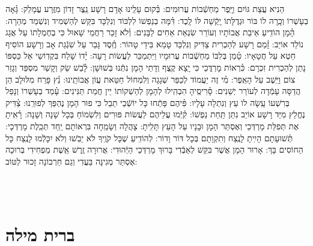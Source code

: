 \documentclass[twoside, openany, parskip=half, 11pt]{book}
\begin{document}
הֵנִיא עֲצַת גּוֹיִם וַיָּֽפֶר מַחְשְֿׁבוֹת עֲרוּמִים: \hfill \break
בְּ֗קוּם עָלֵֽינוּ אָדָם רָשָׁע נֵֽצֶר זָדוֹן מִזֶּֽרַע עֲמָלֵק: \hfill \break
גָּ֗אָה בְעָשְׁרוֹ וְכָֽרָה לוֹ בּוֹר 	וּגְדֻלָּתוֹ יָֽקְֿשָׁה לּוֹ לָֽכֶד: \hfill \break
דִּ֗מָּה בְנַפְשׁוֹ לִלְכּוֹד וְנִלְכָּד 	בִּקֵּשׁ לְהַשְׁמִיד וְנִשְׁמַד מְהֵרָה: \hfill \break
הָ֗מָן הוֹדִֽיעַ אֵיבַת אֲבוֹתָיו 	וְעוֹרֵר שִׂנְאַת אַחִים לַבָּנִים: \hfill \break
וְ֗לֹא זָכַר רַחֲמֵי שָׁאוּל 	כִּי בְחֶמְלָתוֹ עַל אֲגָג נוֹלַד אוֹיֵב: \hfill \break
זָ֗מַם רָשָׁע לְהַכְרִית צַדִּיק 	וְנִלְכַּד טָמֵא בִּידֵי טָהוֹר: \hfill \break
חֶֽ֗סֶד גָּבַר עַל שִׁגְֿגַת אָב 	וְרָשָׁע הוֹסִיף חֵטְא עַל חֲטָאָיו: \hfill \break
טָ֗מַן בְּלִבּוֹ מַחְשְֿׁבוֹת עֲרוּמָיו 	וַיִּתְמַכֵּר לַעֲשׂוֹת רָעָה: \hfill \break
יָ֗דוֹ שָׁלַח בִּקְדֽוֹשֵי אֵל 	כַּסְפּוֹ נָתַן לְהַכְרִית זִכְרָם: \hfill \break
כִּ֗רְאוֹת מׇרְדֳּכַי כִּי יָֽצָא קֶֽצֶף 	וְדָתֵי הָמָן נִתְּֿנוּ בְּשׁוּשָׁן: \hfill \break
לָ֗בַשׁ שַׂק וְקָשַׁר מִסְפֵּד 	וְגָזַר צוֹם וַיֵּֽשֶׁב עַל הָאֵֽפֶר: \hfill \break
מִ֗י זֶה יַעֲמוֹד לְכַפֵּר שְׁגָגָה 	וְלִמְחוֹל חַטַּאת עֲוֹן אֲבוֹתֵֽינוּ: \hfill \break
נֵ֗ץ פָּרַח מִלּוּלָב 	הֵן הֲדַסָּה עָמְֿדָה לְעוֹרֵר יְשֵׁנִים: \hfill \break
סָ֗רִיסֶֽיהָ הִבְהִֽילוּ לְהָמָן 	לְהַשְׁקוֹתוֹ יֵין חֲמַת תַּנִּינִים: \hfill \break
עָ֗מַד בְעָשְׁרוֹ וְנָפַל בְּרִשְׁעוֹ 	עָֽשָׂה לוֹ עֵץ וְנִתְלָה עָלָיו: \hfill \break
פִּ֗יהֶם פָּתְֿחוּ כָּל יוֹשְֿׁבֵי תֵבֵל 	כִּי פוּר הָמָן נֶהְפַּךְ לְפוּרֵֽנוּ: \hfill \break
צַ֗דִּיק נֶחֱלַץ מִיַּד רָשָׁע 	אוֹיֵב נִתַּן תַּֽחַת נַפְשׁוֹ: \hfill \break
קִ֗יְּֿמוּ עֲלֵיהֶם לַעֲשׂוֹת פּוּרִים 	וְלִשְׂמוֹחַ בְּכָל שָׁנָה וְשָׁנָה: \hfill \break
רָ֗אִֽיתָ אֶת תְּפִלַּת מָרְדְּכַי וְאֶסְתֵּר 	הָמָן וּבָנָיו עַל הָעֵץ תָּלִֽיתָ: \hfill \break
 צָהֲלָה וְשָׂמֵֽחָה בִּרְאוֹתָם יַֽחַד תְּכֵֽלֶת מָרְדְּכָי: \hfill \break
תְּ֗שׁוּעָתָם הָיִֽיתָ לָנֶֽצַח וְתִקְוָתָם בְּכָל דּוֹר וָדוֹר: \hfill \break
   לְהוֹדִֽיעַ שֶׁכָּל קֹוֶֽיךָ לֹא יֵבֹֽשׁוּ וְלֹא יִכָּלְֿמוּ לָנֶֽצַח כָּל הַחוֹסִים בָּךְ: \hfill \break
    אָרוּר הָמָן אֲשֶׁר בִּקֵּשׁ לְאַבְּֿדִי בָּרוּךְ מָרְדְּכַי הַיְּֿהוּדִי: \hfill \break
     אֲרוּרָה זֶֽרֶשׁ אֵֽשֶׁת מַפְחִידִי בְּרוּכָה אֶסְתֵּר מְגִינָּה בַּעֲדִי וְגַם חַרְבוֹנָה זָכוּר לְטּוֹב:

\vfill
{}\\
\\


\sepline



\chapter[ברית מילה]{ ברית מילה }
\end{document}
